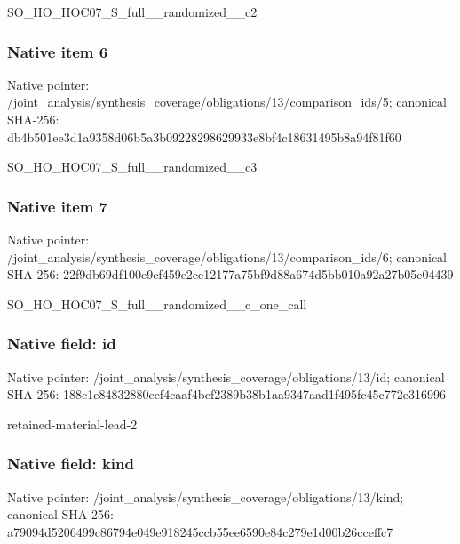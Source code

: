 \documentclass[10pt,a4paper]{article}
\begin{document}
\begingroup\raggedright\sloppy SO\_\allowbreak{}HO\_\allowbreak{}HOC07\_\allowbreak{}S\_\allowbreak{}full\_\allowbreak{}\_\allowbreak{}randomized\_\allowbreak{}\_\allowbreak{}c2\par\endgroup

\subsubsection{Native item 6}
Native pointer: /joint\_\allowbreak{}analysis/synthesis\_\allowbreak{}coverage/obligations/13/comparison\_\allowbreak{}ids/5; canonical SHA-256: db4b501ee3d1a9358d06b5a3b09228298629933e8bf4c18631495b8a94f81f60

\begingroup\raggedright\sloppy SO\_\allowbreak{}HO\_\allowbreak{}HOC07\_\allowbreak{}S\_\allowbreak{}full\_\allowbreak{}\_\allowbreak{}randomized\_\allowbreak{}\_\allowbreak{}c3\par\endgroup

\subsubsection{Native item 7}
Native pointer: /joint\_\allowbreak{}analysis/synthesis\_\allowbreak{}coverage/obligations/13/comparison\_\allowbreak{}ids/6; canonical SHA-256: 22f9db69df100e9cf459e2ce12177a75bf9d88a674d5bb010a92a27b05e04439

\begingroup\raggedright\sloppy SO\_\allowbreak{}HO\_\allowbreak{}HOC07\_\allowbreak{}S\_\allowbreak{}full\_\allowbreak{}\_\allowbreak{}randomized\_\allowbreak{}\_\allowbreak{}c\_\allowbreak{}one\_\allowbreak{}call\par\endgroup

\subsubsection{Native field: id}
Native pointer: /joint\_\allowbreak{}analysis/synthesis\_\allowbreak{}coverage/obligations/13/id; canonical SHA-256: 188c1e84832880eef4caaf4bcf2389b38b1aa9347aad1f495fc45c772e316996

\begingroup\raggedright\sloppy retained-material-lead-2\par\endgroup

\subsubsection{Native field: kind}
Native pointer: /joint\_\allowbreak{}analysis/synthesis\_\allowbreak{}coverage/obligations/13/kind; canonical SHA-256: a79094d5206499c86794e049e918245ccb55ee6590e84c279e1d00b26cceffc7
\end{document}
